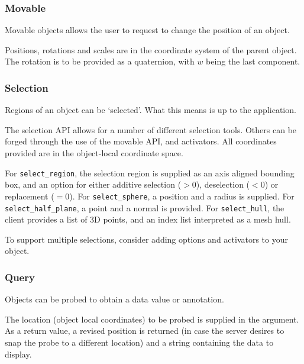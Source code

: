 \documentclass[11pt, oneside]{amsart}
\begin{document}
\subsubsection{Movable}

Movable objects allows the user to request to change the position of an object.



Positions, rotations and scales are in the coordinate system of the parent object. The rotation is to be provided as a quaternion, with $w$ being the last component.

\subsubsection{Selection}

Regions of an object can be `selected'. What this means is up to the application.



The selection API allows for a number of different selection tools. Others can be forged through the use of the movable API, and activators. All coordinates provided are in the object-local coordinate space.

For \texttt{select\_region}, the selection region is supplied as an axis aligned bounding box, and an option for either additive selection ($> 0$), deselection ($< 0$) or replacement ($= 0$). For \texttt{select\_sphere}, a position and a radius is supplied. For \texttt{select\_half\_plane}, a point and a normal is provided. For \texttt{select\_hull}, the client provides a list of 3D points, and an index list interpreted as a mesh hull.

To support multiple selections, consider adding options and activators to your object. 

\subsubsection{Query}
Objects can be probed to obtain a data value or annotation.



The location (object local coordinates) to be probed is supplied in the argument. As a return value, a revised position is returned (in case the server desires to snap the probe to a different location) and a string containing the data to display.
\end{document}

